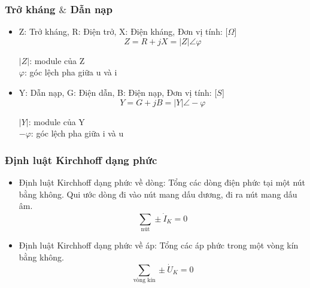 \subsubsection{Trở kháng $\&$ Dẫn nạp}
\begin{itemize}
    \item Z: Trở kháng, R: Điện trở, X: Điện kháng, Đơn vị tính: $\lbrack \Omega \rbrack$
         \begin{equation}
            Z = R + jX = |Z| \angle \varphi
         \end{equation}
        \begin{center}
            $|Z|$: module của Z \\
            $\varphi$: góc lệch pha giữa u và i
        \end{center}
    \item Y: Dẫn nạp, G: Điện dẫn, B: Điện nạp, Đơn vị tính: $\lbrack S \rbrack$
        \begin{equation}
             Y = G + jB = |Y| \angle -\varphi 
        \end{equation}
        \begin{center}
            $|Y|$: module của Y \\
            $-\varphi$: góc lệch pha giữa i và u
        \end{center}
\end{itemize}
\subsubsection{Định luật Kirchhoff dạng phức}
\begin{itemize}
    \item Định luật Kirchhoff dạng phức về dòng: Tổng các dòng điện phức tại một nút bằng không. Qui ước dòng đi vào nút mang dấu dương, đi ra nút mang dấu âm.
        \begin{equation}
            \sum_{\text{nút}}^{} \pm \dot{I}_K = 0
        \end{equation}
    \item Định luật Kirchhoff dạng phức về áp: Tổng các áp phức trong một vòng kín bằng không.
    \begin{equation}
        \sum_{\text{vòng kín}}^{} \pm \dot{U}_K = 0
    \end{equation}
\end{itemize}
